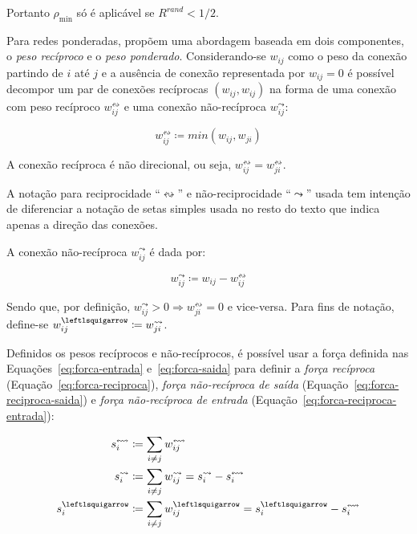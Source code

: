 \documentclass[12pt,a4paper,final]{article}
\newcommand{\defn}{\coloneqq} %
\newcommand{\recin}[1]{#1^\leftlsquigarrow} %
\newcommand{\recout}[1]{#1^\leadsto} %
\newcommand{\recboth}[1]{#1^\leftrightsquigarrow} %
\begin{document}
Portanto $\rho_\text{min}$ só é aplicável se $R^\textit{rand} < 1 / 2$.

Para redes ponderadas,  propõem uma abordagem baseada em dois componentes, o \textit{peso recíproco} e o \textit{peso ponderado}. Considerando-se $w_{ij}$ como o peso da conexão partindo de $i$ até $j$ e a ausência de conexão representada por $w_{ij} = 0$ é possível decompor um par de conexões recíprocas $(w_{ij}, w_{ij})$ na forma de uma conexão com peso recíproco $w^\leftrightsquigarrow_{ij}$ e uma conexão não-recíproca $w^\leadsto_{ij}$:

\begin{equation}
\recboth{w}_{ij} \defn min(w_{ij},w_{ji})
\end{equation}

A conexão recíproca é não direcional, ou seja, $\recboth{w}_{ij} = \recboth{w}_{ji}$.

A notação para reciprocidade \enquote{$\leftrightsquigarrow$} e não-reciprocidade \enquote{$\leadsto$} usada tem intenção de diferenciar a notação de setas simples usada no resto do texto que indica apenas a direção das conexões.

A conexão não-recíproca $\recout{w}_{ij}$ é dada por:
 
\begin{equation}
\recout{w}_{ij} \defn w_{ij} - \recboth{w}_{ij}
\end{equation}

Sendo que, por definição, $\recout{w}_{ij} > 0 \Rightarrow \recboth{w}_{ji} = 0$ e vice-versa. Para fins de notação, define-se $\recin{w}_{ij} \defn \recout{w}_{ji}$.

Definidos os pesos recíprocos e não-recíprocos, é possível usar a força definida nas Equações~\ref{eq:forca-entrada} e~\ref{eq:forca-saida} para definir a \textit{força recíproca} (Equação~\ref{eq:forca-reciproca}), \textit{força não-recíproca de saída}  (Equação~\ref{eq:forca-reciproca-saida}) e \textit{força não-recíproca de entrada}  (Equação~\ref{eq:forca-reciproca-entrada}):

\begin{align}
\recboth{s}_i &\defn \sum_{i \neq j} \recboth{w}_{ij} \label{eq:forca-reciproca} \\
\recout{s}_i  &\defn \sum_{i \neq j} \recout{w}_{ij} = \recout{s}_i - \recboth{s}_i \label{eq:forca-reciproca-saida} \\
\recin{s}_i   &\defn \sum_{i \neq j} \recin{w}_{ij} = \recin{s}_i - \recboth{s}_i \label{eq:forca-reciproca-entrada}
\end{align}
\end{document}

